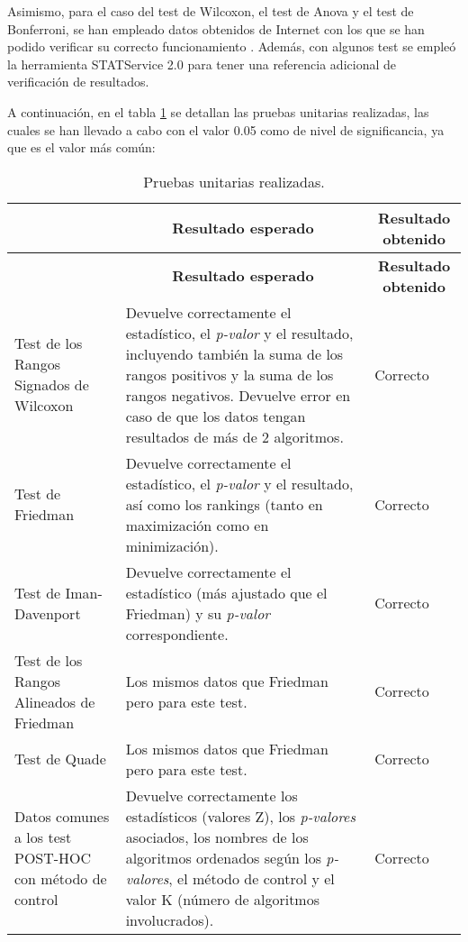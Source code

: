 Asimismo, para el caso del test de Wilcoxon, el test de Anova y el test de Bonferroni, se han empleado datos obtenidos de Internet con los que se han podido verificar su correcto funcionamiento \cite{anova_data}. Además, con algunos test se empleó la herramienta STATService 2.0 \cite{statservice} para tener una referencia adicional de verificación de resultados.

A continuación, en el tabla \ref{unitarias} se detallan las pruebas unitarias realizadas, las cuales se han llevado a cabo con el valor 0.05 como de nivel de significancia, ya que es el valor más común:

\begin{center}
\setlength{\belowcaptionskip}{0.5cm}
\begin{longtable}[H]{| p{3cm}| p{7cm} | p{3cm} |}
	\hline
	\rowcolor{Gray}
	\multicolumn{1}{|c|}{\textbf{Test estadístico}} & \multicolumn{1}{|c|}{\textbf{Resultado esperado}} & \multicolumn{1}{|c|}{\textbf{Resultado obtenido}} \\ \hline
	\endfirsthead
	\hline
	\rowcolor{Gray}
	\multicolumn{1}{|c|}{\textbf{Test estadístico}} & \multicolumn{1}{|c|}{\textbf{Resultado esperado}} & \multicolumn{1}{|c|}{\textbf{Resultado obtenido}} \\ \hline
	\endhead
	\caption{Pruebas unitarias realizadas.}
	\label{unitarias}
	\endfoot
	Test de los Rangos Signados de Wilcoxon & Devuelve correctamente el estadístico, el \textit{p-valor} y el resultado, incluyendo también la suma de los rangos positivos y la suma de los rangos negativos. Devuelve error en caso de que los datos tengan resultados de más de 2 algoritmos. & Correcto \\ \hline
	Test de Friedman & Devuelve correctamente el estadístico, el \textit{p-valor} y el resultado, así como los rankings (tanto en maximización como en minimización). & Correcto \\ \hline
	Test de Iman-Davenport & Devuelve correctamente el estadístico (más ajustado que el Friedman) y su \textit{p-valor} correspondiente. & Correcto \\ \hline
	Test de los Rangos Alineados de Friedman & Los mismos datos que Friedman pero para este test. & Correcto \\ \hline
	Test de Quade & Los mismos datos que Friedman pero para este test. & Correcto \\ \hline
	Datos comunes a los test POST-HOC con método de control & Devuelve correctamente los estadísticos (valores Z), los \textit{p-valores} asociados, los nombres de los algoritmos ordenados según los \textit{p-valores}, el método de control y el valor K (número de algoritmos involucrados). & Correcto \\ \hline

\end{longtable}
\end{center}
